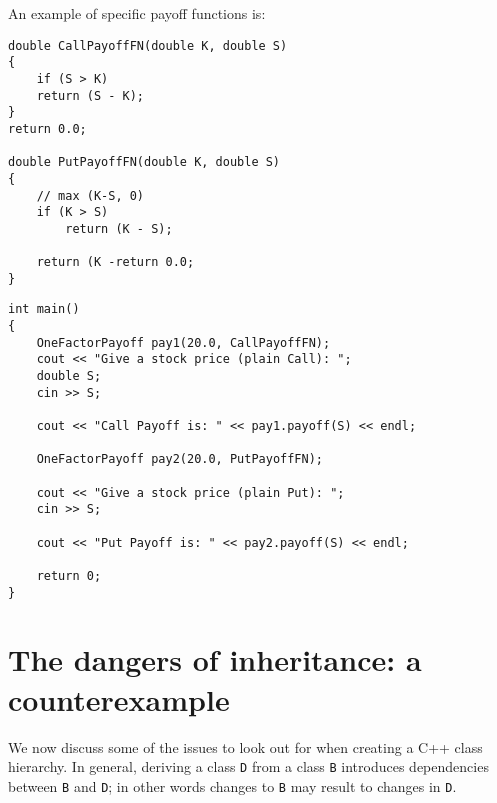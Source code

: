 An example of specific payoff functions is:

\begin{lstlisting}
double CallPayoffFN(double K, double S)
{
	if (S > K)
	return (S - K);
}
return 0.0;

double PutPayoffFN(double K, double S)
{
	// max (K-S, 0)
	if (K > S)
		return (K - S);

	return (K -return 0.0;
}
\end{lstlisting}

\begin{lstlisting}
int main()
{
	OneFactorPayoff pay1(20.0, CallPayoffFN);
	cout << "Give a stock price (plain Call): ";
	double S;
	cin >> S;

	cout << "Call Payoff is: " << pay1.payoff(S) << endl;

	OneFactorPayoff pay2(20.0, PutPayoffFN);

	cout << "Give a stock price (plain Put): ";
	cin >> S;

	cout << "Put Payoff is: " << pay2.payoff(S) << endl;

	return 0;
}
\end{lstlisting}

\section{The dangers of inheritance: a counterexample}

We now discuss some of the issues to look out for when creating a C++ class hierarchy. In general, deriving a class \texttt{D} from a class \texttt{B} introduces dependencies between \texttt{B} and \texttt{D}; in other words changes to \texttt{B} may result to changes in \texttt{D}.

